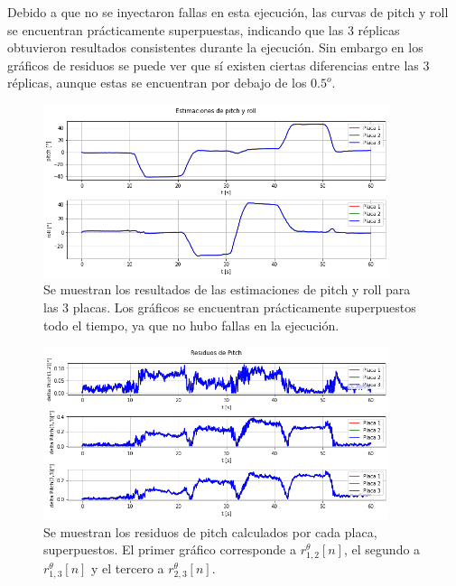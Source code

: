 Debido a que no se inyectaron fallas en esta ejecución, las curvas de pitch y roll se encuentran prácticamente superpuestas, indicando que las 3 réplicas obtuvieron resultados consistentes durante la ejecución. Sin embargo en los gráficos de residuos se puede ver que sí existen ciertas diferencias entre las 3 réplicas, aunque estas se encuentran por debajo de los $0.5^{o}$.

\begin{figure}[H]
    \centering
    \includegraphics[width=0.9\textwidth]{img/resultados_pitch_roll_sin_fallas.png}
    \caption{Se muestran los resultados de las estimaciones de pitch y roll para las 3 placas. Los gráficos se encuentran prácticamente superpuestos todo el tiempo, ya que no hubo fallas en la ejecución.}
    \label{fig:resultados_pitch_roll_sin_fallas}
\end{figure}

\begin{figure}[H]
    \centering
    \includegraphics[width=0.9\textwidth]{img/resultados_residuos_pitch_sin_fallas.png}
    \caption{Se muestran los residuos de pitch calculados por cada placa, superpuestos. El primer gráfico corresponde a $r_{1,2}^{\theta}[n]$, el segundo a $r_{1,3}^{\theta}[n]$ y el tercero a $r_{2,3}^{\theta}[n]$.}
    \label{fig:resultados_residuos_pitch_sin_fallas}    
\end{figure}


